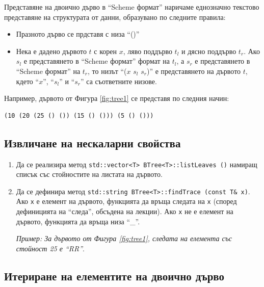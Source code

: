 \documentclass[12pt,a4paper]{article}
\begin{document}
\begin{mdframed}[hidealllines=true,backgroundcolor=gray!20]
Представяне на двоично дърво в ``Scheme формат'' наричаме еднозначно текстово представяне на структурата от данни, образувано по следните правила:
\begin{itemize}
  \item Празното дърво се прдставя с низа ``()''
  \item Нека е дадено дървото $t$ с корен $x$, ляво поддърво $t_l$ и дясно поддърво $t_r$. Ако $s_l$ е представянето в ``Scheme формат'' формат на $t_l$, а $s_r$ е представянето в ``Scheme формат'' на $t_r$, то низът ``($x$ $s_l$ $s_r$)'' е представянето на дървото $t$, кдето ``$x$'', ``$s_l$'' и ``$s_r$'' са съответните низове.

\end{itemize}
Например, дървото от Фигура \ref{fig:tree1} се представя по следния начин:

\begin{verbatim}
(10 (20 (25 () ()) (15 () ())) (5 () ()))
\end{verbatim}

\end{mdframed}

\subsection {Извличане на нескаларни свойства}
\begin{enumerate}[resume]

  \item Да се реализира метод \texttt{std::vector<T> BTree<T>::listLeaves ()} намиращ списък със стойностите на листата на дървото.

  \item Да се дефинира метод \texttt{std::string BTree<T>::findTrace (const T\& x)}. Ако \texttt{x} е елемент на дървото, функцията да връща следата на \texttt{x} (според дефиницията на ``следа'', обсъдена на лекции). Ако \texttt{x} не е елемент на дървото, функцията да връща низа ``\_''.

  \textit{Пример: За дървото от Фигура \ref{fig:tree1}, следата на елемента със стойност 25 е ``RR''}.

\end{enumerate}

\subsection{Итериране на елементите на двоично дърво}
\end{document}
